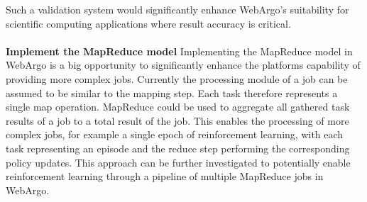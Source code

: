 Such a validation system would significantly enhance WebArgo's suitability for scientific computing applications where result accuracy is critical.
\\~\\
\textbf{Implement the MapReduce model}
\newline
Implementing the MapReduce \cite{conclusion:map-reduce} model in WebArgo is a big opportunity to significantly enhance the platforms capability of providing more complex jobs. Currently the processing module of a job can be assumed to be similar to the mapping step. Each task therefore represents a single map operation. MapReduce could be used to aggregate all gathered task results of a job to a total result of the job. This enables the processing of more complex jobs, for example a single epoch of reinforcement learning, with each task representing an episode and the reduce step performing the corresponding policy updates. This approach can be further investigated to potentially enable reinforcement learning through a pipeline of multiple MapReduce jobs in WebArgo.